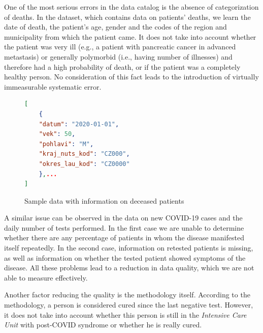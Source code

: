 One of the most serious errors in the data catalog is the absence of categorization of deaths.
In the dataset, which contains data on patients' deaths, we learn the date of death, the patient's age, gender and the codes of the region and municipality from which the patient came.
It does not take into account whether the patient was very ill (e.g., a patient with pancreatic cancer in advanced metastasis) or generally polymorbid (i.e., having number of illnesses) and therefore had a high probability of death, or if the patient was a completely healthy person.
No consideration of this fact leads to the introduction of virtually immeasurable systematic error.

\begin{figure}[htb]
    \centering

    \begin{lstlisting}[language=json,firstnumber=1]
[
    {
    "datum": "2020-01-01",
    "vek": 50,
    "pohlavi": "M",
    "kraj_nuts_kod": "CZ000",
    "okres_lau_kod": "CZ0000"
    },...
]
    \end{lstlisting}

    \caption{Sample data with information on deceased patients}
    \label{ls:sample-data-deceased}
\end{figure}
\FloatBarrier

A similar issue can be observed in the data on new COVID-19 cases and the daily number of tests performed.
In the first case we are unable to determine whether there are any percentage of patients in whom the disease manifested itself repeatedly.
In the second case, information on retested patients is missing, as well as information on whether the tested patient showed symptoms of the disease.
All these problems lead to a reduction in data quality, which we are not able to measure effectively.

Another factor reducing the quality is the methodology itself.
According to the methodology, a person is considered cured since the last negative test.
However, it does not take into account whether this person is still in the \textit{Intensive Care Unit} with post-COVID syndrome or whether he is really cured.

